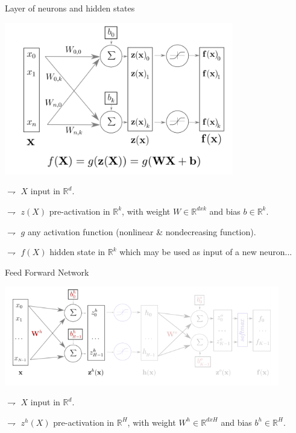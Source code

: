 \documentclass[9pt]{beamer}
\newcommand\R{\mathds{R}}
\begin{document}
\begin{frame}{Layer of neurons and hidden states}

\begin{center}
\includegraphics[width = 0.75\textwidth]{neuronlayer.png}
\end{center}

$\rightharpoondown$ $X$ \alert{input in $\R^d$}.

$\rightharpoondown$ $z(X)$ \alert{pre-activation in $\R^k$}, with \alert{weight $W\in\R^{dxk}$} and \alert{bias $b\in\R^k$}.

$\rightharpoondown$ $g$ \alert{any activation function} (nonlinear \& nondecreasing function).

$\rightharpoondown$ $f(X)$ \alert{hidden state} in $\R^k$ which may be used as input of a new neuron...


\end{frame}

\begin{frame}{Feed Forward Network}

\begin{center}
\includegraphics[width = 0.9\textwidth]{ffnn1.png}
\end{center}

$\rightharpoondown$ $X$ \alert{input in $\R^d$}.

$\rightharpoondown$ $z^h(X)$ \alert{pre-activation in $\R^H$}, with \alert{weight $W^h\in\R^{dxH}$} and \alert{bias $b^h\in\R^H$}.


\end{frame}
\end{document}
